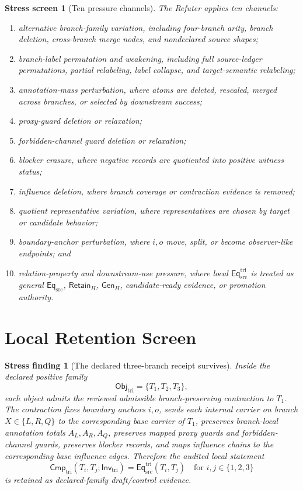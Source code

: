 \documentclass[11pt]{article}
\newcommand{\EqSrc}{\mathsf{Eq}_{\mathrm{src}}}
\newcommand{\EqTri}{\mathsf{Eq}_{\mathrm{src}}^{\mathrm{tri}}}
\newcommand{\ObjTri}{\mathsf{Obj}_{\mathrm{tri}}}
\newcommand{\InvTri}{\mathsf{Inv}_{\mathrm{tri}}}
\newcommand{\CmpTri}{\mathsf{Cmp}_{\mathrm{tri}}}
\newcommand{\RetainH}{\mathsf{Retain}_{H}}
\newcommand{\GenH}{\mathsf{Gen}_{H}}
\newtheorem{stressscreen}{Stress screen}
\newtheorem{stressfinding}{Stress finding}
\begin{document}
\begin{stressscreen}[Ten pressure channels]
The Refuter applies ten channels:
\begin{enumerate}
    \item alternative branch-family variation, including four-branch
    arity, branch deletion, cross-branch merge nodes, and nondeclared
    source shapes;
    \item branch-label permutation and weakening, including full
    source-ledger permutations, partial relabeling, label collapse, and
    target-semantic relabeling;
    \item annotation-mass perturbation, where atoms are deleted,
    rescaled, merged across branches, or selected by downstream success;
    \item proxy-guard deletion or relaxation;
    \item forbidden-channel guard deletion or relaxation;
    \item blocker erasure, where negative records are quotiented into
    positive witness status;
    \item influence deletion, where branch coverage or contraction
    evidence is removed;
    \item quotient representative variation, where representatives are
    chosen by target or candidate behavior;
    \item boundary-anchor perturbation, where \(i,o\) move, split, or
    become observer-like endpoints; and
    \item relation-property and downstream-use pressure, where local
    \(\EqTri\) is treated as general \(\EqSrc\), \(\RetainH\),
    \(\GenH\), candidate-ready evidence, or promotion authority.
\end{enumerate}
\end{stressscreen}

\section{Local Retention Screen}

\begin{stressfinding}[The declared three-branch receipt survives]
Inside the declared positive family
\[
    \ObjTri=\{T_{1},T_{2},T_{3}\},
\]
each object admits the reviewed admissible branch-preserving contraction
to \(T_{1}\). The contraction fixes boundary anchors \(i,o\), sends each
internal carrier on branch \(X\in\{L,R,Q\}\) to the corresponding base
carrier of \(T_{1}\), preserves branch-local annotation totals
\(A_{L},A_{R},A_{Q}\), preserves mapped proxy guards and
forbidden-channel guards, preserves blocker records, and maps influence
chains to the corresponding base influence edges. Therefore the audited
local statement
\[
    \CmpTri(T_i,T_j;\InvTri)=\EqTri(T_i,T_j)
    \quad\text{for } i,j\in\{1,2,3\}
\]
is retained as declared-family draft/control evidence.
\end{stressfinding}
\end{document}
